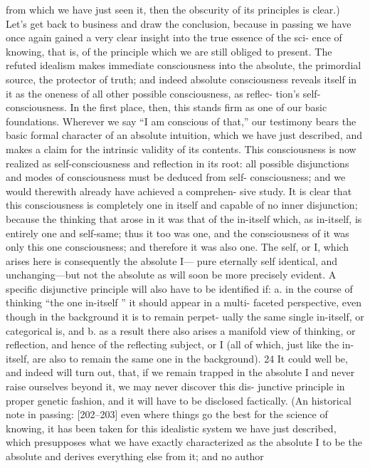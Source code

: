 from which we have just seen it, then the obscurity of its principles is clear.)
Let’s get back to business and draw the conclusion, because in passing
we have once again gained a very clear insight into the true essence of the sci-
ence of knowing, that is, of the principle which we are still obliged to present.
The refuted idealism makes immediate consciousness into the absolute, the
primordial source, the protector of truth; and indeed absolute consciousness
reveals itself in it as the oneness of all other possible consciousness, as reflec-
tion’s self-consciousness. In the first place, then, this stands firm as one of our
basic foundations. Wherever we say “I am conscious of that,” our testimony
bears the basic formal character of an absolute intuition, which we have just
described, and makes a claim for the intrinsic validity of its contents. This
consciousness is now realized as self-consciousness and reflection in its root: all
possible disjunctions and modes of consciousness must be deduced from self-
consciousness; and we would therewith already have achieved a comprehen-
sive study.
It is clear that this consciousness is completely one in itself and capable
of no inner disjunction; because the thinking that arose in it was that of the
in-itself which, as in-itself, is entirely one and self-same; thus it too was one,
and the consciousness of it was only this one consciousness; and therefore it
was also one. The self, or I, which arises here is consequently the absolute I—
pure eternally self identical, and unchanging—but not the absolute as will soon
be more precisely evident. A specific disjunctive principle will also have to be
identified if:
a. in the course of thinking “the one in-itself ” it should appear in a multi-
faceted perspective, even though in the background it is to remain perpet-
ually the same single in-itself, or categorical is, and
b. as a result there also arises a manifold view of thinking, or reflection, and
hence of the reflecting subject, or I (all of which, just like the in-itself, are
also to remain the same one in the background). 24
It could well be, and indeed will turn out, that, if we remain trapped in the
absolute I and never raise ourselves beyond it, we may never discover this dis-
junctive principle in proper genetic fashion, and it will have to be disclosed
factically.
(An historical note in passing: [202–203] even where things go the best
for the science of knowing, it has been taken for this idealistic system we have
just described, which presupposes what we have exactly characterized as the
absolute I to be the absolute and derives everything else from it; and no author

